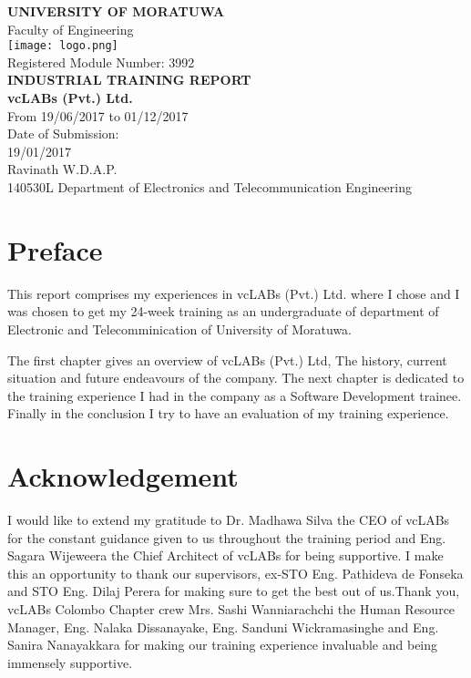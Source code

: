 \documentclass[12pt]{report}
\begin{document}

\begin{titlepage}
    \begin{center}
    	\Large
        \vspace{1cm}
        \textbf{UNIVERSITY OF MORATUWA}\\
        Faculty of Engineering\\
        \vspace{.5cm}
        \texttt{[image: logo.png]}\\
        \vspace{0.5cm}
        Registered Module Number: 3992\\
        \vspace{1cm}
        \textbf{INDUSTRIAL TRAINING REPORT}\\
        \vspace{1cm}
        \textbf{vcLABs (Pvt.) Ltd.}\\
        \vspace{1cm}
        From 19/06/2017 to 01/12/2017\\
        \vspace{.5cm}
        Date of Submission:\\
        19/01/2017\\
        \vspace{.5cm}
        Ravinath W.D.A.P.\\
        140530L Department of Electronics and Telecommunication Engineering
    \end{center}
\end{titlepage}
\renewcommand{\thepage}{\roman{page}}
\chapter*{Preface}

This report comprises my experiences in vcLABs (Pvt.) Ltd. where I chose and I was chosen to get my 24-week training as an undergraduate of department of Electronic and Telecomminication of University of Moratuwa.

The first chapter gives an overview of vcLABs (Pvt.) Ltd, The history, current situation and future endeavours of the company. The next chapter is dedicated to the training experience I had in the company as a Software Development trainee. Finally in the conclusion I try to have an evaluation of my training experience.

\chapter*{Acknowledgement}
I would like to extend my gratitude to Dr. Madhawa Silva the CEO of vcLABs for the constant guidance given to us throughout the training period and Eng. Sagara Wijeweera the Chief Architect of vcLABs for being supportive. I make this an opportunity to thank our supervisors, ex-STO Eng. Pathideva de Fonseka and STO Eng. Dilaj Perera for making sure to get the best out of us.Thank you, vcLABs Colombo Chapter crew Mrs. Sashi Wanniarachchi the Human Resource Manager, Eng. Nalaka Dissanayake, Eng. Sanduni Wickramasinghe and Eng. Sanira Nanayakkara for making our training experience invaluable and being immensely supportive.
\end{document}
